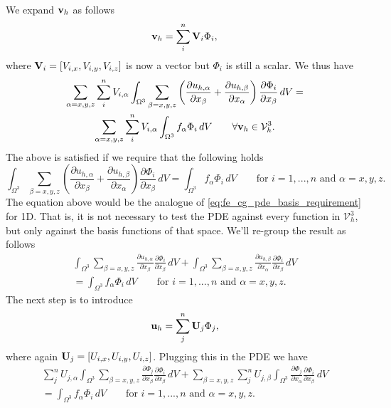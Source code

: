 \documentclass[oneside,a4paper,11pt]{report}
\begin{document}
We expand $\mathbf{v}_h$ as follows
\begin{equation}
    \mathbf{v}_h = \sum_i^n \mathbf{V}_i \Phi_i,
\end{equation}
where $\mathbf{V}_i=[V_{i,x}, V_{i,y}, V_{i,z}]$ is now a vector but $\Phi_i$ is still a scalar. We thus have
\begin{multline}
    \sum_{\alpha=x,y,z} \sum_i^n V_{i,\alpha} \int_{\Omega^3} \sum_{\beta=x,y,z} \left ( \frac{\partial u_{h,\alpha}}{\partial x_\beta} + \frac{\partial u_{h,\beta}}{\partial x_\alpha} \right ) \frac{\partial \Phi_i}{\partial x_\beta} \, dV = \\
    \sum_{\alpha=x,y,z} \sum_i^n V_{i,\alpha} \int_{\Omega^3} f_\alpha \Phi_i \,dV \qquad \forall \mathbf{v}_h \in \mathcal{V}_h^3.
\end{multline}
The above is satisfied if we require that the following holds
\begin{equation}
    \label{eq:fe_3d_pde_basis_requirement}
    \int_{\Omega^3} \sum_{\beta=x,y,z} \left ( \frac{\partial u_{h,\alpha}}{\partial x_\beta} + \frac{\partial u_{h,\beta}}{\partial x_\alpha} \right ) \frac{\partial \Phi_i}{\partial x_\beta} \, dV = \int_{\Omega^3} f_\alpha \Phi_i \,dV \qquad \text{for } i = 1,...,n \text{ and } \alpha = x,y,z.
\end{equation}
The equation above would be the analogue of \cref{eq:fe_cg_pde_basis_requirement} for 1D. That is, it is not necessary to test the PDE against every function in $\mathcal{V}_h^3$, but only against the basis functions of that space. We'll re-group the result as follows
\begin{multline}
    \int_{\Omega^3} \sum_{\beta=x,y,z} \frac{\partial u_{h,\alpha}}{\partial x_\beta} \frac{\partial \Phi_i}{\partial x_\beta} \,dV + \int_{\Omega^3} \sum_{\beta=x,y,z} \frac{\partial u_{h,\beta}}{\partial x_\alpha} \frac{\partial \Phi_i}{\partial x_\beta} \, dV \\
    = \int_{\Omega^3} f_\alpha \Phi_i \,dV \qquad \text{for } i = 1,...,n \text{ and } \alpha = x,y,z.
\end{multline}
The next step is to introduce 
\begin{equation}
    \mathbf{u}_h = \sum_j^n \mathbf{U}_j \Phi_j,
\end{equation}
where again $\mathbf{U}_j = [U_{i,x}, U_{i,y}, U_{i,z}]$. Plugging this in the PDE we have
\begin{multline}
    \sum_j^n U_{j,\alpha} \int_{\Omega^3} \sum_{\beta=x,y,z} \frac{\partial \Phi_j}{\partial x_\beta} \frac{\partial \Phi_i}{\partial x_\beta} \,dV + \sum_{\beta=x,y,z} \sum_j^n U_{j,\beta} \int_{\Omega^3} \frac{\partial \Phi_j}{\partial x_\alpha} \frac{\partial \Phi_i}{\partial x_\beta} \, dV \\
    = \int_{\Omega^3} f_\alpha \Phi_i \,dV \qquad \text{for } i = 1,...,n \text{ and } \alpha = x,y,z.
\end{multline}
\end{document}
